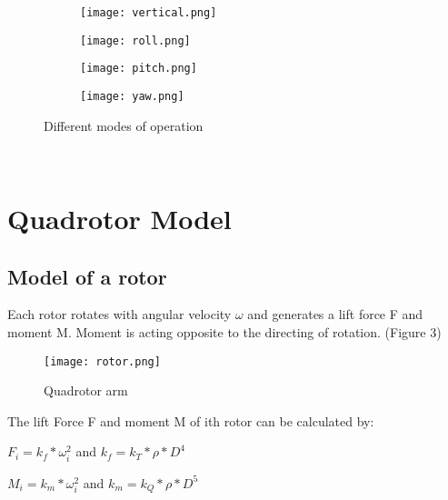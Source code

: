 \documentclass{article}
\begin{document}
\begin{figure}[H]
    \centering
    \begin{subfigure}{0.45\textwidth}
      \texttt{[image: vertical.png]}
      \label{fig:enter-label}
    \end{subfigure}
    \hfill
    \begin{subfigure}{0.45\textwidth}
      \texttt{[image: roll.png]}
      \label{fig:enter-label}
    \end{subfigure}

    \medskip

    \begin{subfigure}{0.45\textwidth}
        \texttt{[image: pitch.png]}
        \label{fig:enter-label}
    \end{subfigure}
    \hfill
    \begin{subfigure}{0.45\textwidth}
        \texttt{[image: yaw.png]}
        \label{fig:enter-label}
    \end{subfigure}
\caption{\label{fig:main}Different modes of operation}  
\end{figure}   
\\

\section{Quadrotor Model}



\subsection{Model of a rotor}

Each rotor rotates with angular velocity $\omega$ and generates a lift force F and moment M. Moment is acting opposite to the directing of rotation. (Figure 3)

\begin{figure}[H]
    \centering
    \texttt{[image: rotor.png]}
    \caption{Quadrotor arm}
    \label{fig:enter-label}
\end{figure}

The lift Force F and moment M of ith rotor can be calculated by:

$F_i = k_f * \omega_i^2$ \hspace{1cm} and \hspace{2cm} $k_f = k_T*\rho * D^4$

$M_i = k_m * \omega_i^2$ \hspace{1cm} and \hspace{1.8cm} $k_m = k_Q*\rho * D^5$
\end{document}
